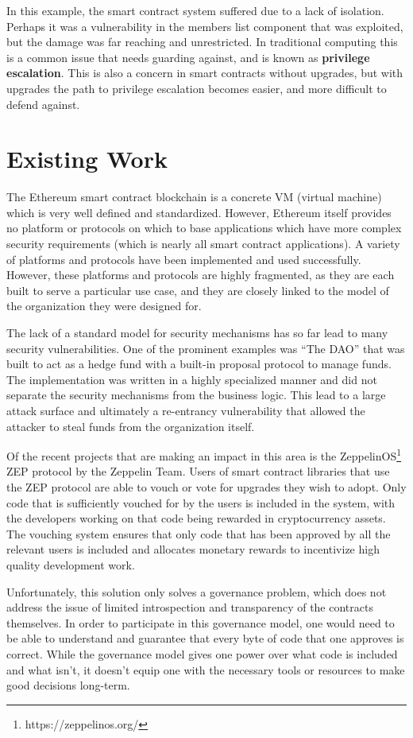 \documentclass[english,a4paper]{article}
\begin{document}
In this example, the smart contract system suffered due to a lack of isolation.
Perhaps it was a vulnerability in the members list component that was exploited,
but the damage was far reaching and unrestricted. In traditional computing this
is a common issue that needs guarding against, and is known as \textbf{privilege
escalation}. This is also a concern in smart contracts without upgrades, but
with upgrades the path to privilege escalation becomes easier, and more
difficult to defend against.

\section{Existing Work}\label{existing-work}
The Ethereum smart contract blockchain is a concrete VM (virtual machine) which
is very well defined and standardized. However, Ethereum itself provides no
platform or protocols on which to base applications which have more complex
security requirements (which is nearly all smart contract applications). A
variety of platforms and protocols have been implemented and used successfully.
However, these platforms and protocols are highly fragmented, as they are each
built to serve a particular use case, and they are closely linked to the model
of the organization they were designed for.

The lack of a standard model for security mechanisms has so far lead to many
security vulnerabilities. One of the prominent examples was ``The DAO''
that was built to act as a hedge fund with a built-in proposal protocol
to manage funds. The implementation was written in a highly specialized
manner and did not separate the security mechanisms from the business
logic. This lead to a large attack surface and ultimately a re-entrancy
vulnerability that allowed the attacker to steal funds from the
organization itself.

Of the recent projects that are making an impact in this area is the
ZeppelinOS\footnote{https://zeppelinos.org/} ZEP protocol by the Zeppelin Team.
Users of smart contract
libraries that use the ZEP protocol are able to vouch or vote for
upgrades they wish to adopt. Only code that is sufficiently vouched for
by the users is included in the system, with the developers working on
that code being rewarded in cryptocurrency assets. The vouching system
ensures that only code that has been approved by all the relevant users
is included and allocates monetary rewards to incentivize high quality
development work.

Unfortunately, this solution only solves a governance problem, which
does not address the issue of limited introspection and transparency of
the contracts themselves. In order to participate in this governance
model, one would need to be able to understand and guarantee that every
byte of code that one approves is correct. While the governance model
gives one power over what code is included and what isn't, it doesn't
equip one with the necessary tools or resources to make good decisions
long-term.
\end{document}

